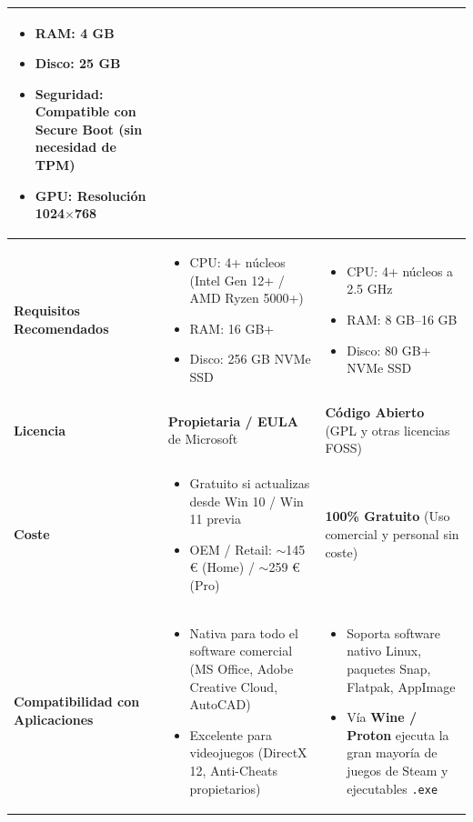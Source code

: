 \documentclass[11.5pt]{article}
\begin{document}
\begin{table}[H]
\begin{tabularx}{\textwidth}{|l|X|X|}
\begin{itemize}[leftmargin=*,nosep]
				\item RAM: 4 GB
				\item Disco: 25 GB
				\item Seguridad: Compatible con Secure Boot (sin necesidad de TPM)
				\item GPU: Resolución 1024\(\times\)768
			\end{itemize} \\
			\hline
			\textbf{Requisitos Recomendados} & 
			\begin{itemize}[leftmargin=*,nosep]
				\item CPU: 4+ núcleos (Intel Gen 12+ / AMD Ryzen 5000+)
				\item RAM: 16 GB+
				\item Disco: 256 GB NVMe SSD
			\end{itemize} & 
			\begin{itemize}[leftmargin=*,nosep]
				\item CPU: 4+ núcleos a 2.5 GHz
				\item RAM: 8 GB–16 GB
				\item Disco: 80 GB+ NVMe SSD
			\end{itemize} \\
			\hline
			\textbf{Licencia} & \textbf{Propietaria / EULA} de Microsoft & \textbf{Código Abierto} (GPL y otras licencias FOSS) \\
			\hline
			\textbf{Coste} & 
			\begin{itemize}[leftmargin=*,nosep]
				\item Gratuito si actualizas desde Win 10 / Win 11 previa
				\item OEM / Retail: \(\sim\)145 € (Home) / \(\sim\)259 € (Pro)
			\end{itemize} & \textbf{100\% Gratuito} (Uso comercial y personal sin coste) \\
			\hline
			\textbf{Compatibilidad con Aplicaciones} & 
			\begin{itemize}[leftmargin=*,nosep]
				\item Nativa para todo el software comercial (MS Office, Adobe Creative Cloud, AutoCAD)
				\item Excelente para videojuegos (DirectX 12, Anti-Cheats propietarios)
			\end{itemize} & 
			\begin{itemize}[leftmargin=*,nosep]
				\item Soporta software nativo Linux, paquetes Snap, Flatpak, AppImage
				\item Vía \textbf{Wine / Proton} ejecuta la gran mayoría de juegos de Steam y ejecutables \texttt{.exe}

\end{itemize}
\end{tabularx}
\end{table}
\end{document}
